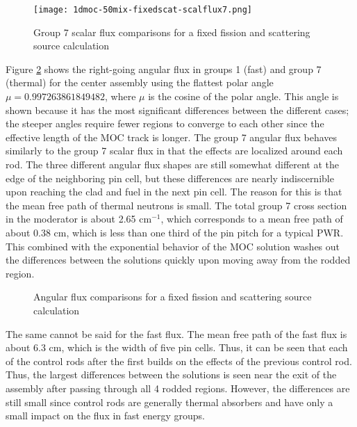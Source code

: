 \begin{figure}[H]
    \centering
    \texttt{[image: 1dmoc-50mix-fixedscat-scalflux7.png]}
    \caption[1D MOC Group 7 Scalar Flux for Fixed Total Source]{Group 7 scalar flux comparisons for a fixed fission and scattering source calculation}\label{f:1dmoc-fixed-50-scalflux7}
\end{figure}

Figure \ref{f:1dmoc-fixed-50-angflux} shows the right-going angular flux in groups 1 (fast) and group 7 (thermal) for the center assembly using the flattest polar angle $\mu = 0.997263861849482$, where $\mu$ is the cosine of the polar angle.  This angle is shown because it has the most significant differences between the different cases; the steeper angles require fewer regions to converge to each other since the effective length of the MOC track is longer.  The group 7 angular flux behaves similarly to the group 7 scalar flux in that the effects are localized around each rod.  The three different angular flux shapes are still somewhat different at the edge of the neighboring pin cell, but these differences are nearly indiscernible upon reaching the clad and fuel in the next pin cell.  The reason for this is that the mean free path of thermal neutrons is small.  The total group 7 cross section in the moderator is about 2.65 cm$^{-1}$, which corresponds to a mean free path of about 0.38 cm, which is less than one third of the pin pitch for a typical PWR.  This combined with the exponential behavior of the MOC solution washes out the differences between the solutions quickly upon moving away from the rodded region.

\begin{figure}[H]
    \centering
    \hfill
    \caption{Angular flux comparisons for a fixed fission and scattering source calculation}\label{f:1dmoc-fixed-50-angflux}
\end{figure}

The same cannot be said for the fast flux.  The mean free path of the fast flux is about 6.3 cm, which is the width of five pin cells.  Thus, it can be seen that each of the control rods after the first builds on the effects of the previous control rod.  Thus, the largest differences between the solutions is seen near the exit of the assembly after passing through all 4 rodded regions.  However, the differences are still small since control rods are generally thermal absorbers and have only a small impact on the flux in fast energy groups.

